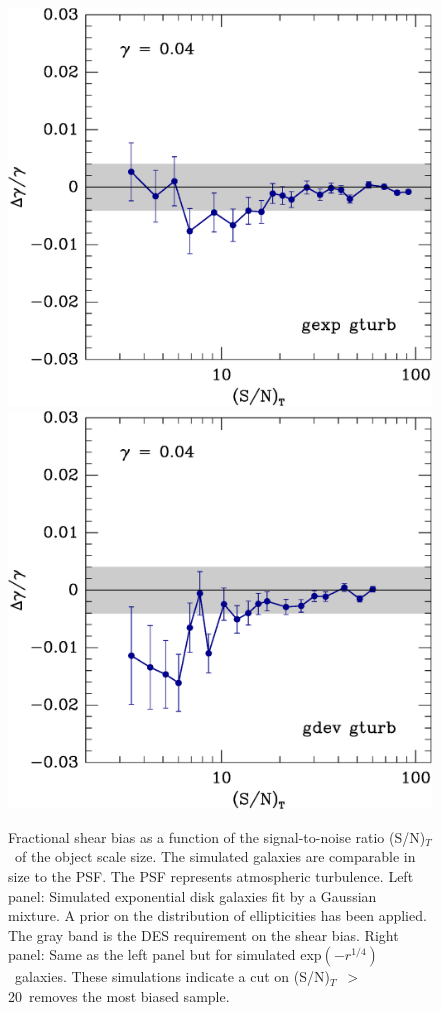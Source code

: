 \documentclass[12pt]{article}
\newcommand{\devprof}{exp$(-r^{1/4})$}
\newcommand{\sncut}{20}
\newcommand{\snsize}{(S/N)$_{T}$}
\begin{document}
\begin{figure}[t]
\centering

\includegraphics[scale=0.4]{mcbayes-get03r01r02r03r04r05-yr-0.030-0.030-frac.eps}
\includegraphics[scale=0.4]{mcbayes-gdt03r01r02r03r04-yr-0.030-0.030-frac.eps}

\caption{Fractional shear bias as a function of the signal-to-noise ratio
    \snsize\ of the object scale size.  The simulated galaxies are comparable
    in size to the PSF.  The PSF represents atmospheric turbulence.  Left
    panel: Simulated exponential disk galaxies fit by a Gaussian mixture.  A
    prior on the distribution of ellipticities has been applied.  The gray band
    is the DES requirement on the shear bias. Right panel: Same as the left
    panel but for simulated \devprof\ galaxies.  These simulations indicate a
    cut on \snsize\ $>$ \sncut\ removes the most biased sample.
\label{fig:getgdt} }

\end{figure}
\end{document}
